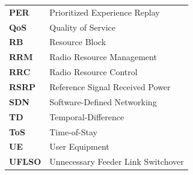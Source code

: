 \begin{flushleft}
\begin{longtable}{l p{}}
\bf{PER}&{Prioritized Experience Replay}\\
\bf{QoS}&{Quality of Service}\\
\bf{RB}&{Resource Block}\\
\bf{RRM}&{Radio Resource Management}\\
\bf{RRC}&{Radio Resource Control}\\
\bf{RSRP}&{Reference Signal Received Power}\\
\bf{SDN}&{Software-Defined Networking}\\
\bf{TD}&{Temporal-Difference}\\
\bf{ToS}&{Time-of-Stay}\\
\bf{UE}&{User Equipment}\\
\bf{UFLSO}&{Unnecessary Feeder Link Switchover}\\
\end{longtable}
\end{flushleft}